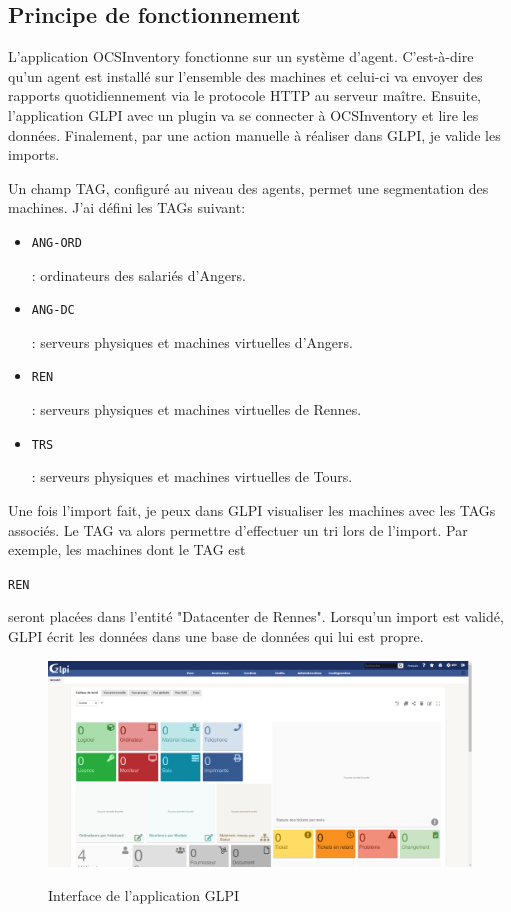 \documentclass[12pt, a4paper, twoside]{article}
\begin{document}
\newpage
\subsection{Principe de fonctionnement}
L'application \gls{OCSInventory} fonctionne sur un système d'agent.
C'est-à-dire qu'un agent est installé sur l'ensemble des machines et celui-ci va envoyer des rapports quotidiennement via le protocole HTTP au serveur maître. 
Ensuite, l'application \gls{GLPI} avec un plugin va se connecter à \gls{OCSInventory} et lire les données.
Finalement, par une action manuelle à réaliser dans \gls{GLPI}, je valide les imports.

Un champ TAG, configuré au niveau des agents, permet une segmentation des machines.
J'ai défini les TAGs suivant:
\begin{itemize}
    \item \begin{code}\texttt{ANG-ORD}\end{code}: ordinateurs des salariés d'Angers.
    \item \begin{code}\texttt{ANG-DC}\end{code}: serveurs physiques et machines virtuelles d'Angers.
    \item \begin{code}\texttt{REN}\end{code}: serveurs physiques et machines virtuelles de Rennes.
    \item \begin{code}\texttt{TRS}\end{code}: serveurs physiques et machines virtuelles de Tours.
\end{itemize}

Une fois l'import fait, je peux dans \gls{GLPI} visualiser les machines avec les TAGs associés. 
Le TAG va alors permettre d'effectuer un tri lors de l'import. 
Par exemple, les machines dont le TAG est \begin{code}\texttt{REN}\end{code} seront placées dans l'entité "Datacenter de Rennes".
Lorsqu'un import est validé, \gls{GLPI} écrit les données dans une base de données qui lui est propre. \\

\begin{figure}[!ht]
    \centering
    \includegraphics[width=\textwidth]{src/interface_glpi.png}
    \label{fig:interface_glpi}
    \caption{Interface de l'application \gls{GLPI}}
\end{figure}
\end{document}
